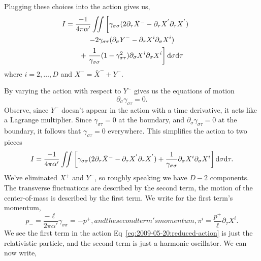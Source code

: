 Plugging these choices into the action gives us,
\begin{multline}
  \action=\frac{-1}{4\pi\alpha'}\iint%
  \left[
\gamma_{\sigma\sigma}(2\partial_{\tau}\bar{X}^{-}-\partial_{\tau}X^{'}\partial_{\tau}X^{'})\phantom{\frac{1}{\gamma_{\sigma\sigma}}}\right.\\
-2\gamma_{\sigma\tau}(\partial_{\sigma}Y^{-}-\partial_{\tau}X^{i}\partial_{\sigma}X^{i})\\
+\left.\frac{1}{\gamma_{\sigma\sigma}}(1-\gamma_{\sigma\tau}^{2})\partial_{\sigma}X^{i}\partial_{\sigma}X^{i}
\right]\D\sigma\D\tau
\end{multline}
where $i=2,\dots,D$ and $X^{-}=\bar{X}^{-}+Y^{-}$.

By varying the action with respect to $Y^{-}$ gives us the equations of
motion
\begin{equation}
\partial_{\sigma}\gamma_{\sigma\tau}=0.
\end{equation}
Observe, since $Y^{-}$ doesn't appear in the action with a time
derivative, it acts like a Lagrange multiplier. Since
$\gamma_{\sigma\tau}=0$ at the boundary, and
$\partial_{\sigma}\gamma_{\sigma\tau}=0$ at the boundary, it follows
that $\gamma_{\sigma\tau}=0$ everywhere. This simplifies the action to
two pieces
\begin{equation}\label{eq:2009-05-20:reduced-action}
  \action=\frac{-1}{4\pi\alpha'}\iint%
  \left[
\gamma_{\sigma\sigma}(2\partial_{\tau}\bar{X}^{-}-\partial_{\tau}X^{'}\partial_{\tau}X^{'})+\frac{1}{\gamma_{\sigma\sigma}}\partial_{\sigma}X^{i}\partial_{\sigma}X^{i}
\right]\D\sigma\D\tau.
\end{equation}
We've eliminated $X^{+}$ and $Y^{-}$, so roughly speaking we have $D-2$
components. The transverse fluctuations are described by the second
term, the motion of the center-of-mass is described by the first term.
We write for the first term's momentum,
\begin{subequations}
\begin{equation}
p_{-} = \frac{-\ell}{2\pi\alpha'}\gamma_{\sigma\sigma} = -p^{+},
\end{equation}
and the second term's momentum,
\begin{equation}
\pi^{i} = \frac{p^{+}}{\ell}\partial_{\tau}X^{i}.
\end{equation}
\end{subequations}
We see the first term in the action
Eq~\eqref{eq:2009-05-20:reduced-action} is just the relativistic
particle, and the second term is just a harmonic oscillator. We can now write,

